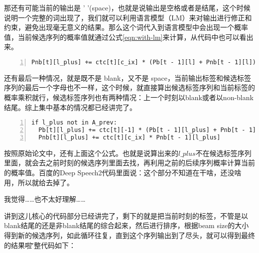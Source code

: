 那还有可能当前的输出是 ' '(space)，也就是说输出是空格或者是结尾，这个时候说明一个完整的词出现了，我们就可以利用语言模型（LM）来对输出进行修正和约束，避免出现毫无意义的结果。那么这个词代入到语言模型中会出现一个概率值，当前候选序列的概率值就通过公式\ref{eqn:with-lm}来计算，从代码中也可以看出来。

\begin{lstlisting}[language = shell, numbers=left, 
         numberstyle=\tiny,keywordstyle=\color{blue!70},
         commentstyle=\color{red!50!green!50!blue!50},frame=shadowbox,
         rulesepcolor=\color{red!20!green!20!blue!20},basicstyle=\ttfamily]
Pnb[t][l_plus] += ctc[t][c_ix] * (Pb[t - 1][l] + Pnb[t - 1][l])
\end{lstlisting}

还有最后一种情况，就是既不是 blank，又不是 space，当前输出标签和候选标签序列的最后一个字母也不一样，这个时候，就直接算出候选标签序列和当前标签的概率乘积就行，候选标签序列也有两种情况：上一个时刻以blank或者以non-blank结尾。综上集中基本的情况都已经讲完了。

\begin{lstlisting}[language = shell, numbers=left, 
         numberstyle=\tiny,keywordstyle=\color{blue!70},
         commentstyle=\color{red!50!green!50!blue!50},frame=shadowbox,
         rulesepcolor=\color{red!20!green!20!blue!20},basicstyle=\ttfamily]
if l_plus not in A_prev:
  Pb[t][l_plus] += ctc[t][-1] * (Pb[t - 1][l_plus] + Pnb[t - 1][l_plus])
  Pnb[t][l_plus] += ctc[t][c_ix] * Pnb[t - 1][l_plus]
\end{lstlisting}

按照原始论文中，还有上面这个公式。也就是说算出来的$l\_plus$不在候选标签序列里面，就会去之前时刻的候选序列里面去找，再利用之前的后续序列概率计算当前的概率值。百度的Deep Speech2代码里面说：这个部分不知道在干啥，还没啥用，所以就给去掉了。

我觉得……也不太好理解……

讲到这儿核心的代码部分已经讲完了，剩下的就是把当前时刻的标签，不管是以blank结尾的还是非blank结尾的综合起来，然后进行排序，根据beam size的大小得到新的候选序列，如此循环往复，直到这个序列输出到了尽头，就可以得到最终的结果啦\~\~\~

完整代码如下：

